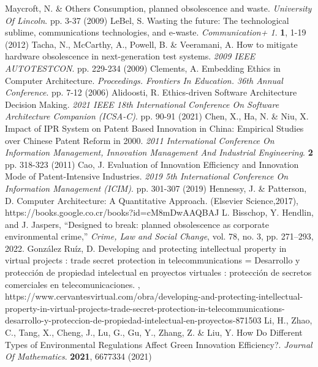 \documentclass[10pt,journal,compsoc]{IEEEtran}
\begin{document}
%
%
%
\begin{thebibliography}{1}

Maycroft, N. \& Others Consumption, planned obsolescence and waste. {\em University Of Lincoln}. pp. 3-37 (2009)
LeBel, S. Wasting the future: The technological sublime, communications technologies, and e-waste. {\em Communication+ 1}. \textbf{1}, 1-19 (2012)
Tacha, N., McCarthy, A., Powell, B. \& Veeramani, A. How to mitigate hardware obsolescence in next-generation test systems. {\em 2009 IEEE AUTOTESTCON}. pp. 229-234 (2009)
Clements, A. Embedding Ethics in Computer Architecture. {\em Proceedings. Frontiers In Education. 36th Annual Conference}. pp. 7-12 (2006)
Alidoosti, R. Ethics-driven Software Architecture Decision Making. {\em 2021 IEEE 18th International Conference On Software Architecture Companion (ICSA-C)}. pp. 90-91 (2021)
Chen, X., Ha, N. \& Niu, X. Impact of IPR System on Patent Based Innovation in China: Empirical Studies over Chinese Patent Reform in 2000. {\em 2011 International Conference On Information Management, Innovation Management And Industrial Engineering}. \textbf{2} pp. 318-323 (2011)
Cao, J. Evaluation of Innovation Efficiency and Innovation Mode of Patent-Intensive Industries. {\em 2019 5th International Conference On Information Management (ICIM)}. pp. 301-307 (2019)
Hennessy, J. \& Patterson, D. Computer Architecture: A Quantitative Approach. (Elsevier Science,2017), https://books.google.co.cr/books?id=cM8mDwAAQBAJ
L. Bisschop, Y. Hendlin, and J. Jaspers, ``Designed to break: planned obsolescence as corporate environmental crime,'' \textit{Crime, Law and Social Change}, vol. 78, no. 3, pp. 271--293, 2022.
González Ruíz, D. Developing and protecting intellectual property in virtual projects : trade secret protection in telecommunications = Desarrollo y protección de propiedad intelectual en proyectos virtuales : protección de secretos comerciales en telecomunicaciones. , https://www.cervantesvirtual.com/obra/developing-and-protecting-intellectual-property-in-virtual-projects-trade-secret-protection-in-telecommunications-desarrollo-y-proteccion-de-propiedad-intelectual-en-proyectos-871503
Li, H., Zhao, C., Tang, X., Cheng, J., Lu, G., Gu, Y., Zhang, Z. \& Liu, Y. How Do Different Types of Environmental Regulations Affect Green Innovation Efficiency?. {\em Journal Of Mathematics}. \textbf{2021}, 6677334 (2021)

\end{thebibliography}
\end{document}
